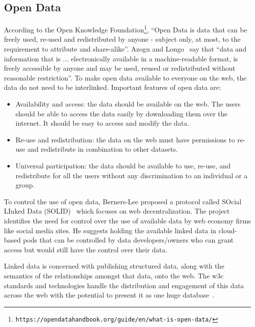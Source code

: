 \begin{doublespace}
\begin{table}[h!]
\end{table}

\subsection{Open Data}
\label{subsec:opendata}

According to the Open Knowledge 
Foundation\footnote{\tt https://opendatahandbook.org/guide/en/what-is-open-data/}, 
``Open Data is data that can be freely used, 
re-used and redistributed by anyone - subject only, 
at most, 
to the requirement to attribute and share-alike''. 
Azogu and Longo~\cite{open2022} say that 
``data and information that is ... electronically available in a 
machine-readable format, is freely accessible by anyone and may be used, reused or redistributed without 
reasonable restriction''.
To make open data available to everyone on the web, 
the data do not need to be interlinked. 
Important features of open data are:

\begin{itemize}
	\item Availability and access: 
	the data should be available on the web. 
  	The users should be able to access the data easily by downloading 
	them over the internet.
	It should be easy to access and modify the data.
  
  	\item Re-use and redistribution: 
	the data on the web must have permissions to re-use and 
	redistribute in combination to other datasets.
 
	\item Universal participation: 
	the data should be available to use, re-use, 
	and redistribute for all the users without any 
	discrimination to an individual or a group.
\end{itemize}

To control the use of open data, 
Berners-Lee 
proposed a protocol called SOcial LInked Data (SOLID)~\cite{soliddemo2016,solidtutorial2016}
which focuses on web decentralization. 
The project identifies the need for control over the use of available data 
by web economy firms like social media sites.
He suggests holding the available linked data in cloud-based pods 
that can be controlled by data developers/owners who can grant access 
but would still have the control over their data. 

Linked data is concerned with publishing structured data,
along with the semantics of the relationships amongst that data,
onto the web.
The \ac{w3c} standards and technologies handle the distribution and 
engagement of this data across the web with the potential to present 
it as one huge database~\cite{bernerslee1999weaving}.


\end{doublespace}
